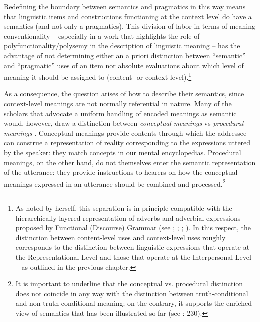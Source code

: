 Redefining the boundary between semantics and pragmatics in this way means that linguistic items and constructions functioning at the context level do have a semantics (and not only a pragmatics). This division of labor in terms of meaning conventionality – especially in a work that highlights the role of polyfunctionality/polysemy in the description of linguistic meaning – has the advantage of not determining either an a priori distinction between “semantic” and “pragmatic” uses of an item nor absolute evaluations about which level of meaning it should be assigned to (content- or context-level).\footnote{As noted by \citet[16]{Hansen2008} herself, this separation is in principle compatible with the hierarchically layered representation of adverbs and adverbial expressions proposed by Functional (Discourse) Grammar (see \citealt{Hengeveld1989}; \citealt{DikEtAl1990}; \citealt{RamatRicca1998}; \citealt{HengeveldMackenzie2008}). In this respect, the distinction between content-level uses and context-level uses roughly corresponds to the distinction between linguistic expressions that operate at the Representational Level and those that operate at the Interpersonal Level – as outlined in the previous chapter.}

As a consequence, the question arises of how to describe their semantics, since context-level meanings are not normally referential in nature. Many of the scholars that advocate a uniform handling of encoded meanings as semantic would, however, draw a distinction between \textit{conceptual} \textit{meanings} vs \textit{procedural meanings} \citep{Blakemore1987}. Conceptual meanings provide contents through which the addressee can construe a representation of reality corresponding to the expressions uttered by the speaker: they match concepts in our mental encyclopedias. Procedural meanings, on the other hand, do not themselves enter the semantic representation of the utterance: they provide instructions to hearers on how the conceptual meanings expressed in an utterance should be combined and processed.\footnote{It is important to underline that the conceptual vs. procedural distinction does not coincide in any way with the distinction between truth-conditional and non-truth-conditional meaning; on the contrary, it supports the enriched view of semantics that has been illustrated so far (see \citealt{Blakemore2006}: 230).}


